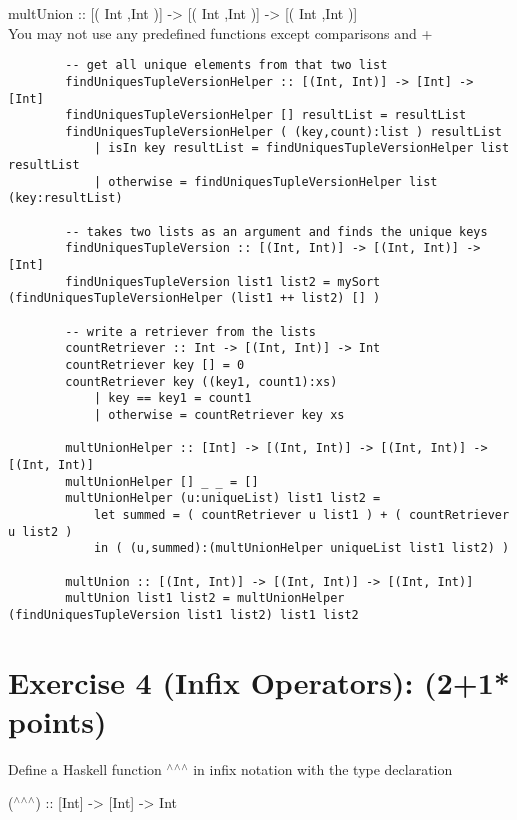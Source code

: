 \documentclass[10pt]{article}
\begin{document}
\begin{itemize}
	multUnion :: [( Int ,Int )] -> [( Int ,Int )] -> [( Int ,Int )]\\
	You may not use any predefined functions except comparisons and +
	
	\begin{addmargin}[0em]{2em}
		\begin{lstlisting}
		-- get all unique elements from that two list
		findUniquesTupleVersionHelper :: [(Int, Int)] -> [Int] -> [Int]
		findUniquesTupleVersionHelper [] resultList = resultList
		findUniquesTupleVersionHelper ( (key,count):list ) resultList
		    | isIn key resultList = findUniquesTupleVersionHelper list resultList
		    | otherwise = findUniquesTupleVersionHelper list (key:resultList)
		
		-- takes two lists as an argument and finds the unique keys
		findUniquesTupleVersion :: [(Int, Int)] -> [(Int, Int)] -> [Int]
		findUniquesTupleVersion list1 list2 = mySort (findUniquesTupleVersionHelper (list1 ++ list2) [] )
		
		-- write a retriever from the lists
		countRetriever :: Int -> [(Int, Int)] -> Int
		countRetriever key [] = 0
		countRetriever key ((key1, count1):xs)
		    | key == key1 = count1
		    | otherwise = countRetriever key xs
		
		multUnionHelper :: [Int] -> [(Int, Int)] -> [(Int, Int)] -> [(Int, Int)]
		multUnionHelper [] _ _ = []
		multUnionHelper (u:uniqueList) list1 list2 =
		    let summed = ( countRetriever u list1 ) + ( countRetriever u list2 )
		    in ( (u,summed):(multUnionHelper uniqueList list1 list2) )
		
		multUnion :: [(Int, Int)] -> [(Int, Int)] -> [(Int, Int)]
		multUnion list1 list2 = multUnionHelper (findUniquesTupleVersion list1 list2) list1 list2
		\end{lstlisting}
	\end{addmargin}
\end{itemize}


\clearpage
\section*{Exercise 4 (Infix Operators): (2+1* points)}

Define a Haskell function $^\wedge$$^\wedge$$^\wedge$ in infix notation with the type declaration

\begin{addmargin}[1em]{2em} 
	($^\wedge$$^\wedge$$^\wedge$) :: [Int] -> [Int] -> Int
\end{addmargin}
\end{document}
